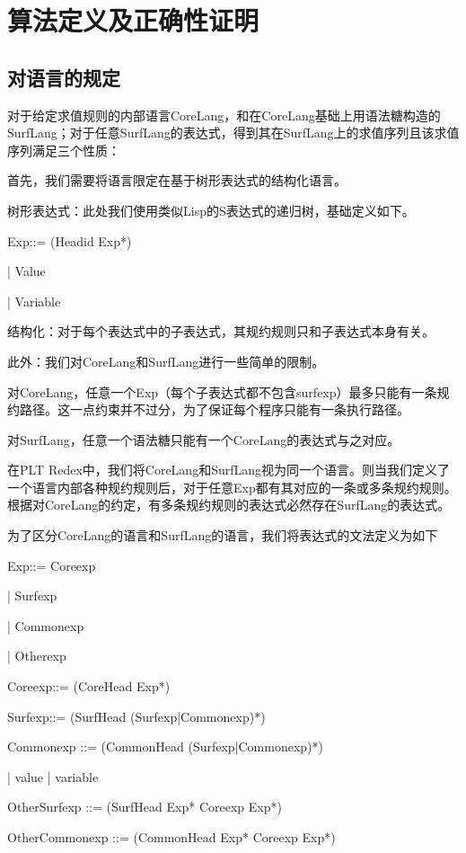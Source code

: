 \pagestyle{fancy}
\normalsize
\linespread{1.5}\selectfont
\chapter{算法定义及正确性证明}

\section{对语言的规定}
对于给定求值规则的内部语言CoreLang，和在CoreLang基础上用语法糖构造的SurfLang；对于任意SurfLang的表达式，得到其在SurfLang上的求值序列且该求值序列满足三个性质：

首先，我们需要将语言限定在基于树形表达式的结构化语言。

树形表达式：此处我们使用类似Lisp的S表达式的递归树，基础定义如下。

Exp::= (Headid Exp*)

|  Value

|  Variable

结构化：对于每个表达式中的子表达式，其规约规则只和子表达式本身有关。

此外：我们对CoreLang和SurfLang进行一些简单的限制。

对CoreLang，任意一个Exp（每个子表达式都不包含surfexp）最多只能有一条规约路径。这一点约束并不过分，为了保证每个程序只能有一条执行路径。

对SurfLang，任意一个语法糖只能有一个CoreLang的表达式与之对应。

在PLT Redex中，我们将CoreLang和SurfLang视为同一个语言。则当我们定义了一个语言内部各种规约规则后，对于任意Exp都有其对应的一条或多条规约规则。根据对CoreLang的约定，有多条规约规则的表达式必然存在SurfLang的表达式。

为了区分CoreLang的语言和SurfLang的语言，我们将表达式的文法定义为如下

Exp::= Coreexp

|  Surfexp

|  Commonexp

|  Otherexp

Coreexp::= (CoreHead Exp*)

Surfexp::= (SurfHead (Surfexp|Commonexp)*)

Commonexp ::= (CommonHead (Surfexp|Commonexp)*)

|   value | variable

OtherSurfexp ::= (SurfHead Exp* Coreexp Exp*)

OtherCommonexp ::= (CommonHead Exp* Coreexp Exp*)


